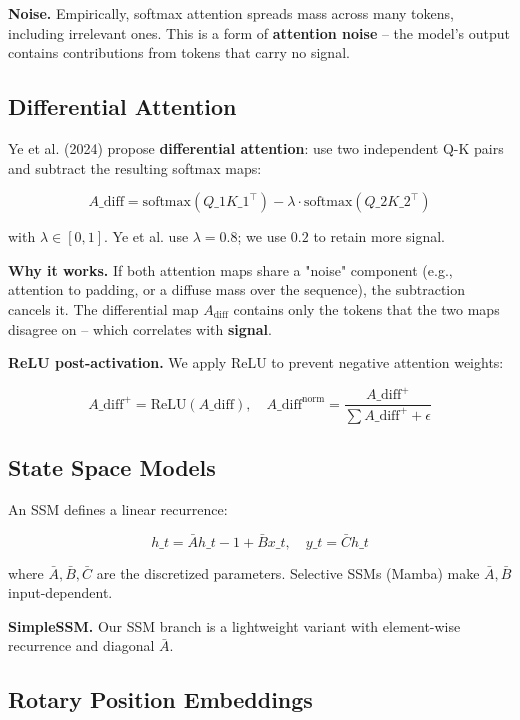 \textbf{Noise.} Empirically, softmax attention spreads mass across many tokens, 
including irrelevant ones. This is a form of \textbf{attention noise} -- the 
model's output contains contributions from tokens that carry no signal.

\subsection{Differential Attention}

Ye et al. (2024) propose \textbf{differential attention}: use two independent 
Q-K pairs and subtract the resulting softmax maps:

\[
A\_\text{diff} = \text{softmax}(Q\_1 K\_1^\top) - \lambda \cdot \text{softmax}(Q\_2 K\_2^\top)
\tag{3.3}
\]

with $\lambda \in [0, 1]$. Ye et al. use $\lambda = 0.8$; we use $0.2$ to 
retain more signal.

\textbf{Why it works.} If both attention maps share a "noise" component (e.g., 
attention to padding, or a diffuse mass over the sequence), the subtraction 
cancels it. The differential map $A_\text{diff}$ contains only the tokens 
that the two maps disagree on -- which correlates with \textbf{signal}.

\textbf{ReLU post-activation.} We apply ReLU to prevent negative attention 
weights:

\[
A\_\text{diff}^+ = \text{ReLU}(A\_\text{diff}), \quad
A\_\text{diff}^\text{norm} = \frac{A\_\text{diff}^+}{\sum A\_\text{diff}^+ + \epsilon}
\tag{3.4}
\]

\subsection{State Space Models}

An SSM defines a linear recurrence:

\[
h\_t = \bar{A} h\_{t-1} + \bar{B} x\_t, \quad
y\_t = \bar{C} h\_t
\tag{3.5}
\]

where $\bar{A}, \bar{B}, \bar{C}$ are the discretized parameters. Selective 
SSMs (Mamba) make $\bar{A}, \bar{B}$ input-dependent.

\textbf{SimpleSSM.} Our SSM branch is a lightweight variant with element-wise 
recurrence and diagonal $\bar{A}$.

\subsection{Rotary Position Embeddings}

